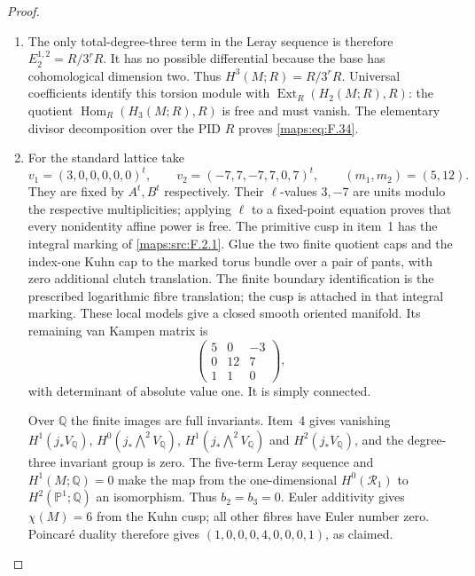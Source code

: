 \documentclass[11pt,a4paper]{article}
\numberwithin{equation}{section}
\theoremstyle{definition}
\begin{document}
\begin{proof}
\begin{enumerate}[label=\arabic*.]
Write $\mathcal R_q=R^qf_*R$.  The stalk/fibre
identification is proper base change
\cite[Tag 09V5, Lemma 20.18.1]{StacksProject}.
The local maps of item~3 give
\[
 0\longrightarrow\mathcal R_2\longrightarrow j_*L_2
 \longrightarrow Q\longrightarrow0,
 \qquad Q_{p_2}=R/3^rR,
\]
with no other support.  Hence its connecting homomorphism gives
$H^1(\mathcal R_2)=R/3^rR$.
The degree-one quotient is also point supported, so
$H^2(\mathcal R_1)=H^2(j_*L_1)=0$.
The degree-three sheaf map is injective, so
$H^0(\mathcal R_3)=0$.

\item The only total-degree-three term in the Leray sequence
\cite[Tag 01F2, Lemma 20.13.4]{StacksProject} is therefore
$E_2^{1,2}=R/3^rR$.  It has no possible differential because
the base has cohomological dimension two.  Thus
$H^3(M;R)=R/3^rR$.
Universal coefficients
\cite[Theorem 3.2, p.~195]{Hatcher2002} identify this torsion
module with $\operatorname{Ext}_R(H_2(M;R),R)$: the quotient
$\operatorname{Hom}_R(H_3(M;R),R)$ is free and must vanish.
The elementary divisor decomposition over the PID $R$ proves
\eqref{maps:eq:F.34}.

\item For the standard lattice take
\[
 v_1=(3,0,0,0,0,0)^t,\qquad
 v_2=(-7,7,-7,7,0,7)^t,\qquad (m_1,m_2)=(5,12).
\]
They are fixed by $A^t,B^t$ respectively.
Their $\ell$-values $3,-7$ are units modulo the respective
multiplicities; applying $\ell$ to a fixed-point equation proves
that every nonidentity affine power is free.
The primitive cusp in item~1 has the integral marking of
\cref{maps:src:F.2.1}.  Glue the two finite quotient caps and
the index-one Kuhn cap to the marked torus bundle over a pair
of pants, with zero additional clutch translation.  The finite
boundary identification is the prescribed logarithmic fibre
translation; the cusp is attached in that integral marking.
These local models give a closed smooth oriented
manifold.  Its remaining van Kampen matrix is
\[
 \begin{pmatrix}5&0&-3\\0&12&7\\1&1&0\end{pmatrix},
\]
with determinant of absolute value one.  It is simply connected.

Over $\mathbb Q$ the finite images are full invariants.
Item~4 gives vanishing $H^1(j_*V_{\mathbb Q})$,
$H^0(j_*\bigwedge^2V_{\mathbb Q})$,
$H^1(j_*\bigwedge^2V_{\mathbb Q})$ and
$H^2(j_*V_{\mathbb Q})$, and the degree-three invariant group
is zero.  The five-term Leray sequence and $H^1(M;\mathbb Q)=0$
make the map from the one-dimensional $H^0(\mathcal R_1)$ to
$H^2(\mathbb P^1;\mathbb Q)$ an isomorphism.
Thus $b_2=b_3=0$.
Euler additivity gives $\chi(M)=6$ from the Kuhn cusp;
all other fibres have Euler number zero.
Poincar\'e duality therefore gives
$(1,0,0,0,4,0,0,0,1)$, as claimed.
\end{enumerate}
\end{proof}
\end{document}
